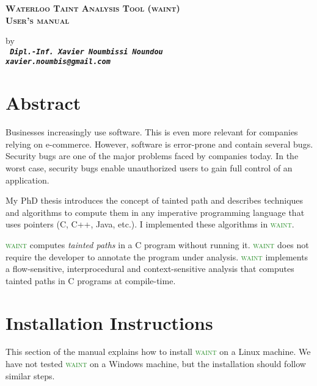 \documentclass[12pt,onecolumn,a4paper]{article}
\newcommand{\waint}{\textcolor{forestgreen}{\textsc{waint}}\xspace}
\begin{document}
\pagestyle{empty}

\author{Xavier NOUMBISSI NOUNDOU}

\begin{center}
\begin{LARGE}
\textsc{\bf Waterloo Taint Analysis Tool (\textsc{waint})}\\
\textsc{\bf User's manual}\\
\end{LARGE}
\begin{large}
by\\
\vspace{0.3cm}
\texttt{ \bf \textit{Dipl.-Inf. Xavier Noumbissi Noundou\\
xavier.noumbis@gmail.com}}\\
\vspace{1.3cm}
\end{large}
\end{center}

\tableofcontents

\section{Abstract}
Businesses increasingly use software. This is even more
relevant for companies relying on e-commerce. However,
software is error-prone and contain several bugs. Security
bugs are one of the major problems faced by companies today.
In the worst case, security bugs enable unauthorized users
to gain full control of an application.

My PhD thesis introduces the concept of tainted path and
describes techniques and algorithms to compute them in
any imperative programming language that uses
pointers (C, C++, Java, etc.). I implemented these
algorithms in \waint.

\waint computes \textcolor{firebrickred}{\textit{tainted paths}}
in a C program without running it. \waint does not require
the developer to annotate the program under analysis.
\waint implements a flow-sensitive, interprocedural and
context-sensitive analysis that computes tainted paths in
C programs at compile-time.

\section{Installation Instructions}
This section of the manual explains how to install \waint
on a Linux machine. We have not tested \waint on a Windows
machine, but the installation should follow similar steps. 
\end{document}
